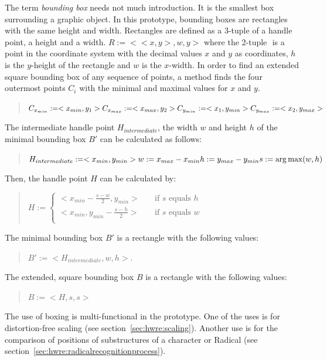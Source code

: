The term \emph{bounding box} needs not much introduction. It is the smallest 
box surrounding a graphic object.
In this prototype, bounding boxes are rectangles with the same height and width.
Rectangles are defined as a 3-tuple of a handle point, a height and a width.
\(R:= <<x,y>, w, y>\) where the 2-tuple \(<x,y>\) is a point in the coordinate
system with the decimal values \(x\) and \(y\) as coordinates, 
\(h\) is the \(y\)-height of the rectangle and \(w\) is the \(x\)-width.
In order to find an extended square bounding box of any sequence of points,
a method finds the four outermost points \(C_i\) with the minimal and maximal 
values for \(x\) and \(y\). 
\begin{quote}
\(
  C_{x_{min}} := <x_{min}, y_1> \\
  C_{x_{max}} := <x_{max}, y_2> \\
  C_{y_{min}} := <x_1, y_{min}> \\
  C_{y_{max}} := <x_2, y_{max}> 
\)
\end{quote}
The intermediate handle point \(H_{intermediate}\), the width \(w\) and 
height \(h\) of the minimal bounding box \(B'\) can be calculated as follows: 
\begin{quote}
\(
  H_{intermediate} := <x_{min}, y_{min}>  \\
  w := x_{max} - x_{min} \\
  h := y_{max} - y_{min} \\
  s := \operatorname{arg\,max}(w,h)
\)
\end{quote}
Then, the handle point \(H\) can be calculated by:
\begin{quote}
\(
  H := 
  \begin{cases}
   <x_{min} - \frac{s-w}{2},y_{min}> & \quad \text{if $s$ equals $h$}\\
   <x_{min}, y_{min} - \frac{s-h}{2}> & \quad \text{if $s$ equals $w$}\\
  \end{cases}
\)
\end{quote}
The minimal bounding box \(B'\) is a rectangle with the following values:
\begin{quote}
  \(B' := <H_{intermediate}, w, h>\).
\end{quote}
The extended, square bounding box \(B\) is a rectangle with the 
following values:
\begin{quote}
  \(B := <H, s, s>\)
\end{quote}
The use of boxing is multi-functional in the prototype. One of the uses is
for distortion-free scaling (see section~\ref{sec:hwre:scaling}). Another use 
is for the comparison of positions of substructures of a character or 
Radical (see section~\ref{sec:hwre:radicalrecognitionprocess}).

